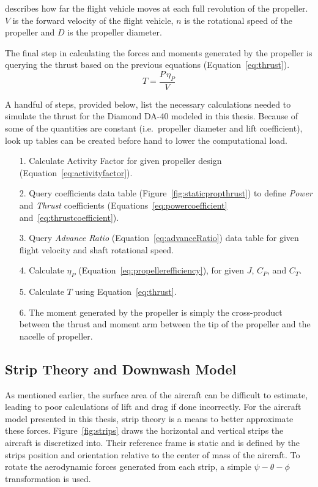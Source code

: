 describes how far the flight vehicle moves at each full revolution of the propeller.
\(V\) is the forward velocity of the flight vehicle, \(n\) is the rotational speed of the propeller and \(D\) is the propeller diameter.

The final step in calculating the forces and moments generated by the propeller is querying the thrust based on the previous equations (Equation~\ref{eq:thrust}).
\begin{equation}\label{eq:thrust}
    T = \frac{P \, \eta_P}{V}
\end{equation}

A handful of steps, provided below, list the necessary calculations needed to simulate the thrust for the Diamond DA-40 modeled in this thesis. Because of some of the quantities are constant (i.e.\ propeller diameter and lift coefficient), look up tables can be created before hand to lower the computational load.

\begin{itemize}
    \item[1.] Calculate Activity Factor for given propeller design (Equation~\ref{eq:activityfactor}).
    \item[2.] Query coefficients data table (Figure~\ref{fig:staticpropthrust}) to define \textit{Power} and \textit{Thrust} coefficients (Equations~\ref{eq:powercoefficient} and~\ref{eq:thrustcoefficient}).
    \item[3.] Query \textit{Advance Ratio} (Equation~\ref{eq:advanceRatio}) data table for given flight velocity and shaft rotational speed.
    \item[4.] Calculate \( \eta_P \) (Equation~\ref{eq:propellerefficiency}), for given \(J\), \(C_P\), and \(C_T\).
    \item[5.] Calculate \(T\) using Equation~\ref{eq:thrust}.
    \item[6.] The moment generated by the propeller is simply the cross-product between the thrust and moment arm between the tip of the propeller and the nacelle of propeller.
\end{itemize}

\subsection{Strip Theory and Downwash Model}

As mentioned earlier, the surface area of the aircraft can be difficult to estimate, leading to poor calculations of lift and drag if done incorrectly. For the aircraft model presented in this thesis, strip theory is a means to better approximate these forces. Figure~\ref{fig:strips} draws the horizontal and vertical strips the aircraft is discretized into. Their reference frame is static and is defined by the strips position and orientation relative to the center of mass of the aircraft. To rotate the aerodynamic forces generated from each strip, a simple \( \psi-\theta-\phi \) transformation is used.

